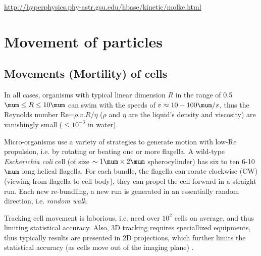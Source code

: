 \url{http://hyperphysics.phy-astr.gsu.edu/hbase/kinetic/molke.html}




\chapter{Movement of particles}
\label{chap:appendix-b}

\section{Movements (Mortility) of cells}

\begin{framed}
In all cases, organisms with typical linear dimension $R$ in the range of
0.5$\mum \le R \le 10\mum$ can swim with the speeds of $v \approx 10-100\mum/s$,
thus the Reynolds number Re=$\rho.v.R/\eta$ ($\rho$ and $\eta$ are the liquid's
density and viscosity) are vanishingly small ($\le 10^{-3}$ in water).
\end{framed}

Micro-organisms use a variety of strategies to generate motion with low-Re
propulsion, i.e. by rotating or beating one or more flagella. A wild-type {\it
Escherichia coli} cell (of size $\sim 1\mum \times 2\mum$ spherocylinder) has
six to ten 6-10$\mum$ long helical flagella. For each bundle, the flagella can
rorate clockwise (CW) (viewing from flagella to cell body), they can propel the
cell forward in a straight run. Each new re-bundling, a new run is generated in
an essentially random direction, i.e. {\it random walk}.

\begin{framed}
Tracking cell movement is laborious, i.e. need over $10^2$ cells on average, and
thus limiting statistical accuracy. Also, 3D tracking requires speciallized
equipments, thus typically results are presented in 2D projections, which
further limits the statistical accuracy (as cells move out of the imaging
plane) \citep{martinez2012}. 
\end{framed}

